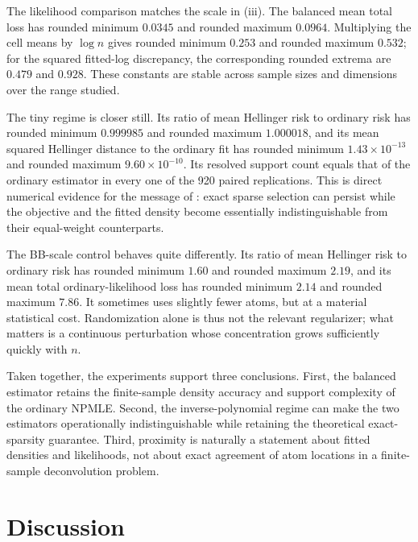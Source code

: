 \documentclass[11pt]{article}
\theoremstyle{definition}
\theoremstyle{remark}
\begin{document}
The likelihood comparison matches the scale in (iii).  The
balanced mean total loss has rounded minimum $0.0345$ and rounded maximum
$0.0964$.  Multiplying the cell means by $\log n$ gives rounded minimum
$0.253$ and rounded maximum $0.532$; for the squared fitted-log discrepancy,
the corresponding rounded extrema are $0.479$ and $0.928$.  These constants
are stable across sample sizes and dimensions over the range studied.

The tiny regime is closer still.  Its ratio of mean Hellinger risk to
ordinary risk has rounded minimum $0.999985$ and rounded maximum $1.000018$,
and its mean squared Hellinger distance to the ordinary fit has rounded
minimum $1.43\times10^{-13}$ and rounded maximum $9.60\times10^{-10}$.  Its
resolved support count equals that of the ordinary estimator in every one of
the 920 paired replications.  This is direct numerical evidence for the
message of : exact sparse selection can persist while the
objective and the fitted density become essentially indistinguishable from
their equal-weight counterparts.

The BB-scale control behaves quite differently.  Its ratio of mean Hellinger
risk to ordinary risk has rounded minimum $1.60$ and rounded maximum $2.19$,
and its mean total ordinary-likelihood loss has rounded minimum $2.14$ and
rounded maximum $7.86$.  It sometimes uses slightly fewer atoms, but at a
material statistical cost.  Randomization alone is thus not the relevant
regularizer; what matters is a continuous perturbation whose concentration
grows sufficiently quickly with $n$.

Taken together, the experiments support three conclusions.  First, the
balanced estimator retains the finite-sample density accuracy and support
complexity of the ordinary NPMLE.  Second, the inverse-polynomial regime can
make the two estimators operationally indistinguishable while retaining the
theoretical exact-sparsity guarantee.  Third, proximity is naturally a
statement about fitted densities and likelihoods, not about exact agreement
of atom locations in a finite-sample deconvolution problem.

\section{Discussion}\label{sec:discussion}
\end{document}
